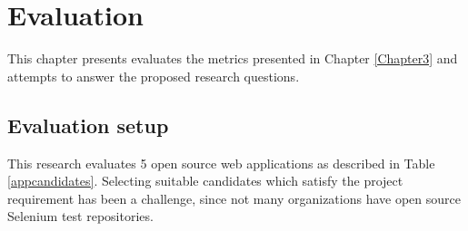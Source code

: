\chapter{Evaluation} %

\label{Chapter6} %

This chapter presents evaluates the metrics presented in Chapter \ref{Chapter3} and attempts to answer the proposed research questions. 

\section{Evaluation setup}
\label{evalsetup}
This research evaluates 5 open source web applications as described in Table \ref{appcandidates}. Selecting suitable candidates which satisfy the project requirement has been a challenge, since not many organizations have open source Selenium test repositories. 


